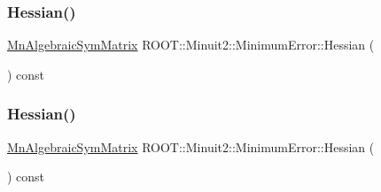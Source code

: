 \mbox{\label{classROOT_1_1Minuit2_1_1MinimumError_a7f591009a8e0d017a77da5efa5f6a7e0}} 
\subsubsection{\texorpdfstring{Hessian()}{Hessian()}\hspace{0.1cm}{\footnotesize\ttfamily [1/2]}}
{\footnotesize\ttfamily \mbox{\hyperlink{namespaceROOT_1_1Minuit2_a9e74ad97f5537a2e80e52b04d98ecc6e}{Mn\+Algebraic\+Sym\+Matrix}} R\+O\+O\+T\+::\+Minuit2\+::\+Minimum\+Error\+::\+Hessian (\begin{DoxyParamCaption}{ }\end{DoxyParamCaption}) const\hspace{0.3cm}{\ttfamily [inline]}}

\mbox{\label{classROOT_1_1Minuit2_1_1MinimumError_a7f591009a8e0d017a77da5efa5f6a7e0}} 
\subsubsection{\texorpdfstring{Hessian()}{Hessian()}\hspace{0.1cm}{\footnotesize\ttfamily [2/2]}}
{\footnotesize\ttfamily \mbox{\hyperlink{namespaceROOT_1_1Minuit2_a9e74ad97f5537a2e80e52b04d98ecc6e}{Mn\+Algebraic\+Sym\+Matrix}} R\+O\+O\+T\+::\+Minuit2\+::\+Minimum\+Error\+::\+Hessian (\begin{DoxyParamCaption}{ }\end{DoxyParamCaption}) const\hspace{0.3cm}{\ttfamily [inline]}}

